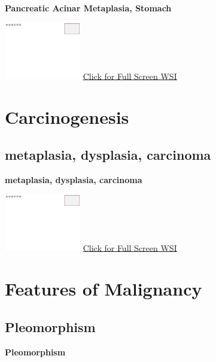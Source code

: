 \documentclass[
  letterpaper,
  paper=6in:9in,
  pagesize=pdftex,
  headinclude=on,
  footinclude=on,
  12pt]{scrbook}
\begin{document}
\textbf{Pancreatic Acinar Metaplasia, Stomach}

\href{https://images.patolojiatlasi.com/template/HE.html}{\includegraphics[width=0.25\textwidth,height=\textheight]{./screenshots/template_screenshot.png}}
\href{https://images.patolojiatlasi.com/metaplasia/HE.html}{Click for
Full Screen WSI}

\hypertarget{sec-carcinogenesis}{%
\chapter{Carcinogenesis}\label{sec-carcinogenesis}}

\hypertarget{sec-metaplasia-dysplasia-carcinoma}{%
\section{metaplasia, dysplasia,
carcinoma}\label{sec-metaplasia-dysplasia-carcinoma}}

\textbf{metaplasia, dysplasia, carcinoma}

\href{https://images.patolojiatlasi.com/template/HE.html}{\includegraphics[width=0.25\textwidth,height=\textheight]{./screenshots/template_screenshot.png}}
\href{https://images.patolojiatlasi.com/carcinogenesis/HE.html}{Click
for Full Screen WSI}

\hypertarget{sec-features-of-malignancy}{%
\chapter{Features of Malignancy}\label{sec-features-of-malignancy}}

\hypertarget{sec-pleomorphism}{%
\section{Pleomorphism}\label{sec-pleomorphism}}

\textbf{Pleomorphism}
\end{document}
